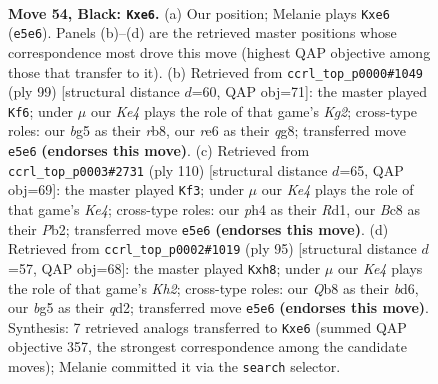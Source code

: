 \documentclass[11pt]{article}
\begin{document}
\begin{figure}[p]\centering
\begin{subfigure}{0.46\textwidth}\centering
\resizebox{\linewidth}{!}{%
\newchessgame
\chessboard[
  setfen={1qb5/r7/4R3/p2pkpBQ/P6P/8/8/RN4K1 b - - 0 54},
  showmover=false,
  pgfstyle=straightmove, color=movearrow, markmove={e5-e6}
]}
\caption{}
\end{subfigure}\hfill
\begin{subfigure}{0.46\textwidth}\centering
\resizebox{\linewidth}{!}{%
\newchessgame
\chessboard[
  setfen={1R4Q1/5pk1/3q3r/b1p1p3/2P1P3/6P1/5PK1/8 b - - 3 50},
  showmover=false,
  pgfstyle=straightmove, color=movearrow, markmove={g7-f6}
]}
\caption{}
\end{subfigure}
\\[4pt]
\begin{subfigure}{0.46\textwidth}\centering
\resizebox{\linewidth}{!}{%
\newchessgame
\chessboard[
  setfen={3r2k1/4P2p/1P4p1/p4q2/4KP2/4Q3/1P6/3R4 w - - 6 56},
  showmover=false,
  pgfstyle=straightmove, color=movearrow, markmove={e4-f3}
]}
\caption{}
\end{subfigure}\hfill
\begin{subfigure}{0.46\textwidth}\centering
\resizebox{\linewidth}{!}{%
\newchessgame
\chessboard[
  setfen={7R/5p1k/p2B2p1/3P4/8/8/3Q1P1K/4rq2 b - - 5 48},
  showmover=false,
  pgfstyle=straightmove, color=movearrow, markmove={h7-h8}
]}
\caption{}
\end{subfigure}
\caption{\textbf{Move 54, Black: \texttt{Kxe6}.} (a) Our position; Melanie plays \texttt{Kxe6} (\texttt{e5e6}). Panels (b)--(d) are the retrieved master positions whose correspondence most drove this move (highest QAP objective among those that transfer to it). (b) Retrieved from \texttt{ccrl\_top\_p0000\#1049} (ply 99) [structural distance $d$=60, QAP obj=71]: the master played \texttt{Kf6}; under $\mu$ our \emph{Ke4} plays the role of that game's \emph{Kg2}; cross-type roles: our \emph{b}g5 as their \emph{r}b8, our \emph{r}e6 as their \emph{q}g8; transferred move \texttt{e5e6} \textbf{(endorses this move)}. (c) Retrieved from \texttt{ccrl\_top\_p0003\#2731} (ply 110) [structural distance $d$=65, QAP obj=69]: the master played \texttt{Kf3}; under $\mu$ our \emph{Ke4} plays the role of that game's \emph{Ke4}; cross-type roles: our \emph{p}h4 as their \emph{R}d1, our \emph{B}c8 as their \emph{P}b2; transferred move \texttt{e5e6} \textbf{(endorses this move)}. (d) Retrieved from \texttt{ccrl\_top\_p0002\#1019} (ply 95) [structural distance $d$=57, QAP obj=68]: the master played \texttt{Kxh8}; under $\mu$ our \emph{Ke4} plays the role of that game's \emph{Kh2}; cross-type roles: our \emph{Q}b8 as their \emph{b}d6, our \emph{b}g5 as their \emph{q}d2; transferred move \texttt{e5e6} \textbf{(endorses this move)}. Synthesis: 7 retrieved analogs transferred to \texttt{Kxe6} (summed QAP objective 357, the strongest correspondence among the candidate moves); Melanie committed it via the \texttt{search} selector.}
\label{fig:thought-m107}
\end{figure}
\end{document}
